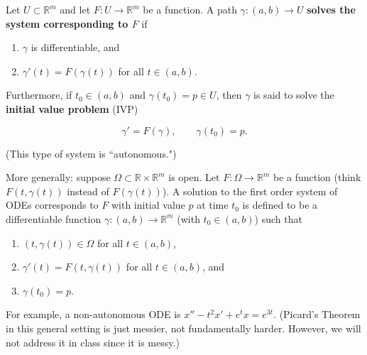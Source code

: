 \begin{definition}

Let \(U \subset \mathbb{R}^m\) and let \(F: U \to \mathbb{R}^m\) be a function. A path \(\gamma:(a,b) \to U\) \textbf{solves the system corresponding to \(F\)} if 

\begin{enumerate}

\item \(\gamma\) is differentiable, and

\item \(\gamma'(t) = F(\gamma(t))\) for all \(t \in (a,b)\).

\end{enumerate}

Furthermore, if \(t_0 \in (a,b)\) and \(\gamma(t_0) = p \in U\), then \(\gamma\) is said to solve the \textbf{initial value problem} (IVP)

\[
\gamma' = F(\gamma), \qquad \gamma(t_0) = p.
\]

(This type of system is ``autonomous.")

More generally: suppose \(\Omega \subset \mathbb{R} \times \mathbb{R}^m\) is open. Let \(F: \Omega \to \mathbb{R}^m\) be a function (think \(F(t, \gamma(t))\) instead of \(F(\gamma(t))\)). A solution to the first order system of ODEs corresponds to \(F\) with initial value \(p\) at time \(t_0\) is defined to be a differentiable function \(\gamma: (a,b) \to \mathbb{R}^m\) (with \(t_0 \in (a,b)\)) such that 

\begin{enumerate}

\item \((t, \gamma(t)) \in \Omega\) for all \(t \in (a,b)\),

\item \(\gamma'(t) = F(t, \gamma(t))\) for all \(t \in (a,b)\), and

\item \(\gamma(t_0) = p\).

\end{enumerate}

For example, a non-autonomous ODE is \(x'' - t^2x' + e^t x = e^{3t}\). (Picard's Theorem in this general setting is just messier, not fundamentally harder. However, we will not address it in class since it is messy.)

\end{definition}



